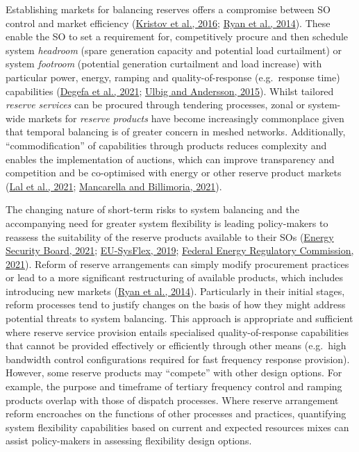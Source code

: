 \documentclass[12pt,a4paper,]{report}
\begin{document}
Establishing markets for balancing reserves offers a compromise between
SO control and market efficiency
(\protect\hyperlink{ref-kristovTaleTwoVisions2016}{Kristov et al.,
2016}; \protect\hyperlink{ref-ryanVariableGenerationReserves2014}{Ryan
et al., 2014}). These enable the SO to set a requirement for,
competitively procure and then schedule system \emph{headroom} (spare
generation capacity and potential load curtailment) or system
\emph{footroom} (potential generation curtailment and load increase)
with particular power, energy, ramping and quality-of-response
(e.g.~response time) capabilities
(\protect\hyperlink{ref-degefaComprehensiveClassificationsCharacterizations2021}{Degefa
et al., 2021};
\protect\hyperlink{ref-ulbigAnalyzingOperationalFlexibility2015}{Ulbig
and Andersson, 2015}). Whilst tailored \emph{reserve services} can be
procured through tendering processes, zonal or system-wide markets for
\emph{reserve products} have become increasingly commonplace given that
temporal balancing is of greater concern in meshed networks.
Additionally, ``commodification'' of capabilities through products
reduces complexity and enables the implementation of auctions, which can
improve transparency and competition and be co-optimised with energy or
other reserve product markets
(\protect\hyperlink{ref-lalEssentialSystemServices2021}{Lal et al.,
2021};
\protect\hyperlink{ref-mancarellaFragileGridPhysics2021}{Mancarella and
Billimoria, 2021}).

The changing nature of short-term risks to system balancing and the
accompanying need for greater system flexibility is leading
policy-makers to reassess the suitability of the reserve products
available to their SOs
(\protect\hyperlink{ref-energysecurityboardPost2025Market2021}{Energy
Security Board, 2021};
\protect\hyperlink{ref-eu-sysflexProductDefinitionInnovative2019}{EU-SysFlex,
2019};
\protect\hyperlink{ref-federalenergyregulatorycommissionEnergyAncillaryServices2021}{Federal
Energy Regulatory Commission, 2021}). Reform of reserve arrangements can
simply modify procurement practices or lead to a more significant
restructuring of available products, which includes introducing new
markets (\protect\hyperlink{ref-ryanVariableGenerationReserves2014}{Ryan
et al., 2014}). Particularly in their initial stages, reform processes
tend to justify changes on the basis of how they might address potential
threats to system balancing. This approach is appropriate and sufficient
where reserve service provision entails specialised quality-of-response
capabilities that cannot be provided effectively or efficiently through
other means (e.g.~high bandwidth control configurations required for
fast frequency response provision). However, some reserve products may
``compete'' with other design options. For example, the purpose and
timeframe of tertiary frequency control and ramping products overlap
with those of dispatch processes. Where reserve arrangement reform
encroaches on the functions of other processes and practices,
quantifying system flexibility capabilities based on current and
expected resources mixes can assist policy-makers in assessing
flexibility design options.
\end{document}
